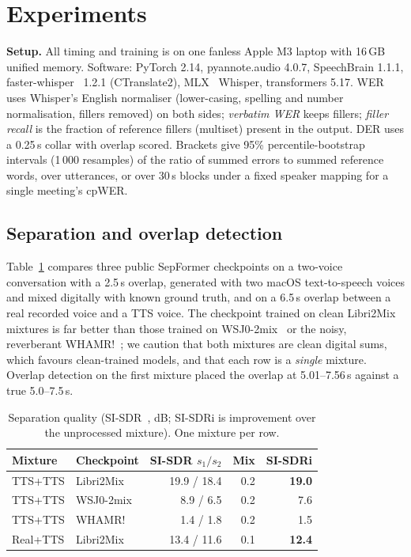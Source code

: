 \documentclass[conference]{IEEEtran}
\begin{document}
\section{Experiments}\label{sec:exp}
\textbf{Setup.} All timing and training is on one fanless Apple M3 laptop with 16\,GB unified memory. Software: PyTorch 2.14, pyannote.audio 4.0.7, SpeechBrain 1.1.1, faster-whisper~\cite{fasterwhisper} 1.2.1 (CTranslate2), MLX~\cite{mlx2023} Whisper, transformers 5.17. WER uses Whisper's English normaliser (lower-casing, spelling and number normalisation, fillers removed) on both sides; \emph{verbatim WER} keeps fillers; \emph{filler recall} is the fraction of reference fillers (multiset) present in the output. DER uses a 0.25\,s collar with overlap scored. Brackets give 95\% percentile-bootstrap intervals (1\,000 resamples) of the ratio of summed errors to summed reference words, over utterances, or over 30\,s blocks under a fixed speaker mapping for a single meeting's cpWER.

\subsection{Separation and overlap detection}
Table~\ref{tab:sep} compares three public SepFormer checkpoints on a two-voice conversation with a 2.5\,s overlap, generated with two macOS text-to-speech voices and mixed digitally with known ground truth, and on a 6.5\,s overlap between a real recorded voice and a TTS voice. The checkpoint trained on clean Libri2Mix~\cite{cosentino2020librimix} mixtures is far better than those trained on WSJ0-2mix~\cite{hershey2016deepclustering} or the noisy, reverberant WHAMR!~\cite{maciejewski2020whamr}; we caution that both mixtures are clean digital sums, which favours clean-trained models, and that each row is a \emph{single} mixture. Overlap detection on the first mixture placed the overlap at 5.01--7.56\,s against a true 5.0--7.5\,s.

\begin{table}[t]
\caption{Separation quality (SI-SDR~\cite{leroux2019sdr}, dB; SI-SDRi is improvement over the unprocessed mixture). One mixture per row.}
\label{tab:sep}
\centering\footnotesize\setlength{\tabcolsep}{3.5pt}
\begin{tabular}{@{}llrrr@{}}
\toprule
Mixture & Checkpoint & SI-SDR $s_1/s_2$ & Mix & SI-SDRi \\
\midrule
TTS+TTS & Libri2Mix & 19.9 / 18.4 & 0.2 & \textbf{19.0} \\
TTS+TTS & WSJ0-2mix & 8.9 / 6.5 & 0.2 & 7.6 \\
TTS+TTS & WHAMR! & 1.4 / 1.8 & 0.2 & 1.5 \\
Real+TTS & Libri2Mix & 13.4 / 11.6 & 0.1 & \textbf{12.4} \\
\bottomrule
\end{tabular}
\end{table}
\end{document}
